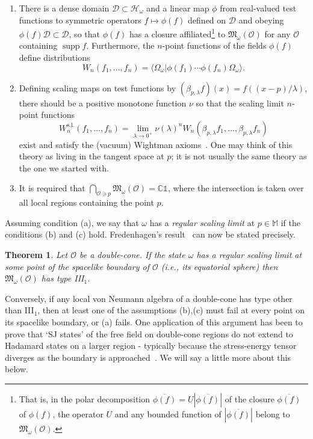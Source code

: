 \documentclass[12pt]{article}
\newcommand{\1}{\mathds{1}}                         %
\newcommand{\CC}{\mathbb{C}}           %
\newcommand{\Ocal}{\mathcal{O}}
\newcommand{\MM}{\mathbb{M}}
\newcommand{\HH}{{\mathcal{H}}}
\newcommand{\DD}{{\mathscr{D}}}
\newcommand{\Mf}{{\mathfrak{M}}}
\newcommand{\II}{{\mathbb{1}}}
\newcommand{\ip}[2]{\langle #1|#2\rangle}
\newtheorem{theorem}{Theorem}%
\DeclareMathOperator{\supp}{supp}
\begin{document}
\begin{enumerate}[label=(\alph*)]
	\item There is a dense domain $\DD\subset \HH_\omega$ and a linear map $\phi$
	from real-valued test functions to symmetric operators $f\mapsto\phi(f)$ defined on $\DD$ and obeying $\phi(f)\DD\subset\DD$, so that $\phi(f)$ has a closure affiliated\footnote{That is, in the polar decomposition $\overline{\phi(f)}=U|\overline{\phi(f)}|$ of the closure $\overline{\phi(f)}$ of $\phi(f)$, the operator $U$ and any bounded function of $|\overline{\phi(f)}|$ belong to $\Mf_\omega(\Ocal)$.} 
	to $\Mf_\omega(\Ocal)$ for any $\Ocal$ containing $\supp f$. Furthermore, the $n$-point functions of the fields $\phi(f)$ define distributions
	\[
	W_n(f_1,\ldots,f_n)= \ip{\Omega_\omega}{\phi(f_1)\cdots\phi(f_n)\Omega_\omega}.
	\]
	\item Defining scaling maps on test functions by $(\beta_{p,\lambda}f)(x)=f((x-p)/\lambda)$, there should be a positive monotone function $\nu$ so that the scaling limit $n$-point functions
	\[
	W_n^{\text{s.l.}}(f_1,\ldots,f_n) = \lim_{\lambda\to 0^+} \nu(\lambda)^n W_n(\beta_{p,\lambda}f_1,\ldots,\beta_{p,\lambda} f_n)
	\] 
	exist and
	satisfy the (vacuum) Wightman axioms~\cite{StreaterWightman}. One may think of this theory as living in the tangent space at $p$; it is not usually the same theory as the one we started with.
	\item It is required that $\bigcap_{\Ocal\owns p}\Mf_\omega(\Ocal)=\CC\II$, where the intersection is taken over all local regions containing the point $p$.
\end{enumerate}
Assuming condition (a), we say that $\omega$ has a \emph{regular scaling limit} at $p\in\MM$ if the conditions (b) and (c) hold. Fredenhagen's result~\cite{Fredenhagen:1985} can now be stated precisely.
\begin{theorem}\label{thm:universaltype}
	Let $\Ocal$ be a double-cone. If the state $\omega$ has a regular scaling limit at some point of the spacelike boundary of $\Ocal$ (i.e., its equatorial sphere) then $\Mf_\omega(\Ocal)$ has type III${}_1$.   
\end{theorem} 
Conversely, if any local von Neumann algebra of a double-cone has type other than III${}_1$, then at least one of the assumptions (b),(c) must fail at every point on its spacelike boundary, or (a) fails. One application of this argument has been to prove that `SJ states' of the free field on double-cone regions do not extend to Hadamard states on a larger region - typically because the stress-energy tensor diverges as the boundary is approached~\cite{FewsterVerch:2013}. We will say a little more about this below.
\end{document}
